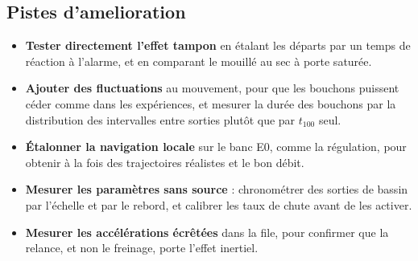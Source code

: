 \subsection{Pistes d'amelioration}

\begin{itemize}
  \item \textbf{Tester directement l'effet tampon} en étalant les départs par un temps de
        réaction à l'alarme, et en comparant le mouillé au sec à porte saturée.
  \item \textbf{Ajouter des fluctuations} au mouvement, pour que les bouchons puissent céder
        comme dans les expériences, et mesurer la durée des bouchons par la distribution des
        intervalles entre sorties plutôt que par $t_{100}$ seul.
  \item \textbf{Étalonner la navigation locale} sur le banc E0, comme la régulation, pour
        obtenir à la fois des trajectoires réalistes et le bon débit.
  \item \textbf{Mesurer les paramètres sans source} : chronométrer des sorties de bassin par
        l'échelle et par le rebord, et calibrer les taux de chute avant de les activer.
  \item \textbf{Mesurer les accélérations écrêtées} dans la file, pour confirmer que la
        relance, et non le freinage, porte l'effet inertiel.
\end{itemize}
